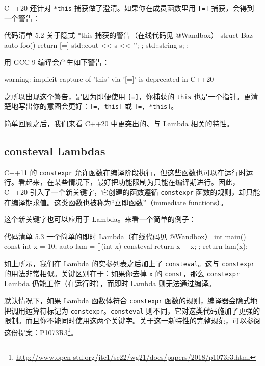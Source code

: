 C++20 还针对 \texttt{*this} 捕获做了澄清。如果你在成员函数里用 \texttt{[=]} 捕获，会得到一个警告：

\begin{codeboxt}{代码清单 5.2 关于隐式 *this 捕获的警告（在线代码见 @Wandbox）}
struct Baz {
auto foo() {
return [=] { std::cout << s << '\n'; };
}
std::string s;
};
\end{codeboxt}

用 GCC 9 编译会产生如下警告：

\begin{codebox}
warning: implicit capture of 'this' via '[=]' is deprecated in C++20
\end{codebox}

之所以出现这个警告，是因为即便使用 \texttt{[=]}，你捕获的 \texttt{this} 也是一个指针。更清楚地写出你的意图会更好：\texttt{[=, this]} 或 \texttt{[=, *this]}。

简单回顾之后，我们来看 C++20 中更突出的、与 Lambda 相关的特性。

\subsection{consteval Lambdas}

C++11 的 \texttt{constexpr} 允许函数在编译阶段执行，但这些函数也可以在运行时运行。看起来，在某些情况下，最好把功能限制为只能在编译期进行。因此，C++20 引入了一个新关键字，它创建的函数遵循 \texttt{constexpr} 函数的规则，却只能在编译期求值。这类函数也被称为“立即函数”（immediate functions）。

这个新关键字也可以应用于 Lambda。来看一个简单的例子：

\begin{codeboxt}{代码清单 5.3 一个简单的即时 Lambda（在线代码见 @Wandbox）}
int main() {
const int x = 10;
auto lam = [](int x) consteval { return x + x; };
return lam(x);
}
\end{codeboxt}

如上所示，我们在 Lambda 的实参列表之后加上了 \texttt{consteval}。这与 \texttt{constexpr} 的用法非常相似。关键区别在于：如果你去掉 \texttt{x} 的 \texttt{const}，那么 \texttt{constexpr} Lambda 仍能工作（在运行时），而即时 Lambda 则无法通过编译。

默认情况下，如果 Lambda 函数体符合 \texttt{constexpr} 函数的规则，编译器会隐式地把调用运算符标记为 \texttt{constexpr}。\texttt{consteval} 则不同，它对这类代码施加了更强的限制。而且你不能同时使用这两个关键字。关于这一新特性的完整规范，可以参阅这份提案：P1073R3\footnote{\url{http://www.open-std.org/jtc1/sc22/wg21/docs/papers/2018/p1073r3.html}}。

